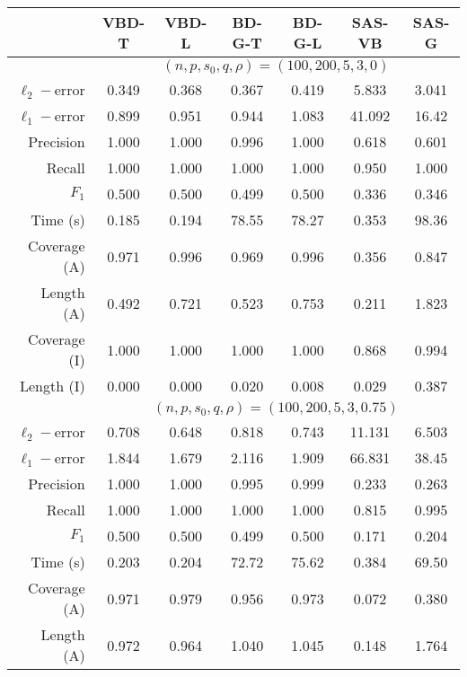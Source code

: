 \documentclass[11pt]{article}
\numberwithin{equation}{section}
\begin{document}
\begin{table}[h]
\centering

\begin{tabular}{r|cc|cc|cc}
\toprule
               & VBD-T & VBD-L & BD-G-T & BD-G-L & SAS-VB & SAS-G \\ \bottomrule
                & \multicolumn{6}{c}{$(n, p, s_0, q, \rho) = (100, 200, 5, 3, 0)$} \\\toprule
$\ell_2-$error & 0.349   & 0.368   & 0.367  & 0.419  & 5.833  & 3.041 \\
$\ell_1-$error & 0.899   & 0.951   & 0.944  & 1.083  & 41.092 & 16.42 \\ \hline
Precision      & 1.000   & 1.000   & 0.996  & 1.000  & 0.618  & 0.601 \\
Recall         & 1.000   & 1.000   & 1.000  & 1.000  & 0.950  & 1.000 \\
$F_1$          & 0.500   & 0.500   & 0.499  & 0.500  & 0.336  & 0.346 \\ \hline
Time (s)       & 0.185   & 0.194   & 78.55  & 78.27  & 0.353  & 98.36 \\ \hline
Coverage (A)   & 0.971   & 0.996   & 0.969  & 0.996  & 0.356  & 0.847 \\
Length (A)     & 0.492   & 0.721   & 0.523  & 0.753  & 0.211  & 1.823 \\ \hline
Coverage (I)   & 1.000   & 1.000   & 1.000  & 1.000  & 0.868  & 0.994 \\
Length (I)     & 0.000   & 0.000   & 0.020  & 0.008  & 0.029  & 0.387 \\ \bottomrule 
& \multicolumn{6}{c}{$(n, p, s_0, q, \rho) = (100, 200, 5, 3, 0.75)$} \\ \toprule
$\ell_2-$error & 0.708 & 0.648 & 0.818 & 0.743 & 11.131 & 6.503 \\
$\ell_1-$error & 1.844 & 1.679 & 2.116 & 1.909 & 66.831 & 38.45 \\ \hline
Precision      & 1.000 & 1.000 & 0.995 & 0.999 & 0.233  & 0.263 \\
Recall         & 1.000 & 1.000 & 1.000 & 1.000 & 0.815  & 0.995 \\
$F_1$          & 0.500 & 0.500 & 0.499 & 0.500 & 0.171  & 0.204 \\ \hline
Time (s)       & 0.203 & 0.204 & 72.72 & 75.62 & 0.384  & 69.50 \\ \hline
Coverage (A)   & 0.971 & 0.979 & 0.956 & 0.973 & 0.072  & 0.380 \\
Length (A)     & 0.972 & 0.964 & 1.040 & 1.045 & 0.148  & 1.764 \\\hline

\end{tabular}
\end{table}
\end{document}
